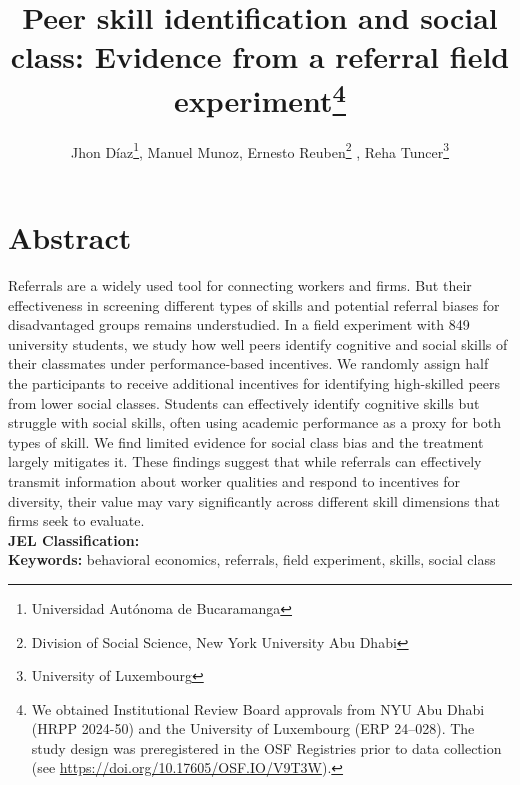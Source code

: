 \documentclass[11pt,a4paper,oneside]{article}
\title{Peer skill identification and social class:
Evidence from a referral field experiment\footnote{We obtained Institutional Review Board approvals from NYU Abu Dhabi (HRPP 2024-50) and the University of Luxembourg (ERP 24–028). The study design was preregistered in the OSF Registries prior to data collection (see \url{https://doi.org/10.17605/OSF.IO/V9T3W}).} }
\author{Jhon Díaz\footnote{Universidad Autónoma de Bucaramanga}, Manuel Munoz\footremember{liser}{Luxembourg Institute of Socio-Economic Research}, Ernesto Reuben\footnote{Division of Social Science, New York University Abu Dhabi} \footrecall{liser}, Reha Tuncer\footnote{University of Luxembourg}}
\begin{document}
\linenumbers 
\maketitle



\section*{Abstract}
Referrals are a widely used tool for connecting workers and firms. But their effectiveness in screening different types of skills and potential referral biases for disadvantaged groups remains understudied. In a field experiment with 849 university students, we study how well peers identify cognitive and social skills of their classmates under performance-based incentives. We randomly assign half the participants to receive additional incentives for identifying high-skilled peers from lower social classes. Students can effectively identify cognitive skills but struggle with social skills, often using academic performance as a proxy for both types of skill. We find limited evidence for social class bias and the treatment largely mitigates it. These findings suggest that while referrals can effectively transmit information about worker qualities and respond to incentives for diversity, their value may vary significantly across different skill dimensions that firms seek to evaluate.
\medskip \\
\textbf{JEL Classification:} \\
\textbf{Keywords:} behavioral economics, referrals, field experiment, skills, social class

\end{document}
